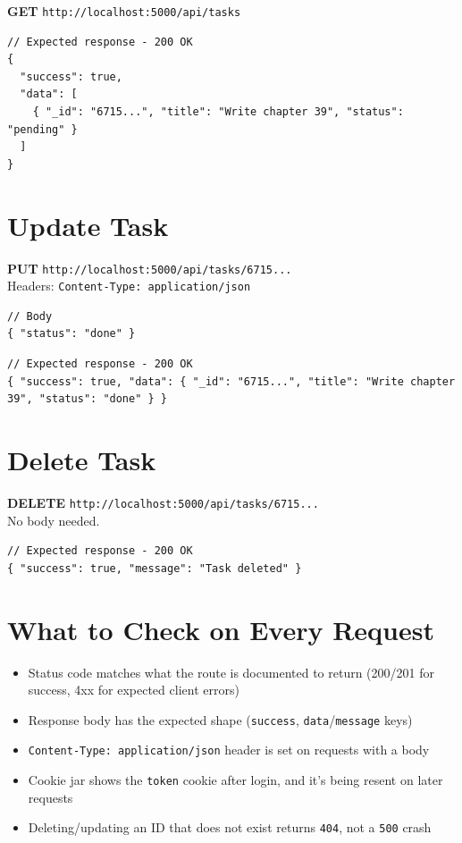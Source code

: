 \textbf{GET} \texttt{http://localhost:5000/api/tasks}

\begin{lstlisting}
// Expected response - 200 OK
{
  "success": true,
  "data": [
    { "_id": "6715...", "title": "Write chapter 39", "status": "pending" }
  ]
}
\end{lstlisting}

\section{Update Task}

\textbf{PUT} \texttt{http://localhost:5000/api/tasks/6715...}\\
Headers: \texttt{Content-Type: application/json}

\begin{lstlisting}
// Body
{ "status": "done" }
\end{lstlisting}

\begin{lstlisting}
// Expected response - 200 OK
{ "success": true, "data": { "_id": "6715...", "title": "Write chapter 39", "status": "done" } }
\end{lstlisting}

\section{Delete Task}

\textbf{DELETE} \texttt{http://localhost:5000/api/tasks/6715...}\\
No body needed.

\begin{lstlisting}
// Expected response - 200 OK
{ "success": true, "message": "Task deleted" }
\end{lstlisting}

\section{What to Check on Every Request}

\begin{itemize}
\item[$\square$] Status code matches what the route is documented to return (200/201 for success, 4xx for expected client errors)
\item[$\square$] Response body has the expected shape (\texttt{success}, \texttt{data}/\texttt{message} keys)
\item[$\square$] \texttt{Content-Type: application/json} header is set on requests with a body
\item[$\square$] Cookie jar shows the \texttt{token} cookie after login, and it's being resent on later requests
\item[$\square$] Deleting/updating an ID that does not exist returns \texttt{404}, not a \texttt{500} crash
\end{itemize}


